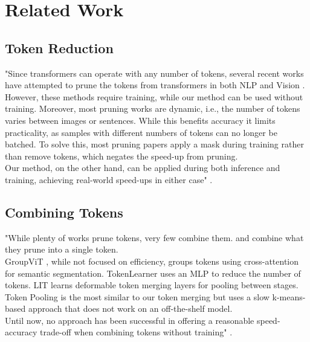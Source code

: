 \section{Related Work}

\subsection*{Token Reduction}
"Since transformers can operate with any number of tokens, several recent works have attempted to prune the tokens from transformers in both NLP \cite{goyal2020power, kim2020length, kim2022learned, lassance2021study} and Vision \cite{meng2022adavit, yin2022vit, kong2021spvit, song2022cp, rao2021dynamicvit, fayyaz2022adaptive, yu2023unified}.\\
However, these methods require training, while our method can be used without training. Moreover, most
pruning works are dynamic, i.e., the number of tokens varies between images or sentences. While this benefits accuracy it limits practicality, as samples with different numbers of tokens can no longer be batched. To solve this, most pruning papers apply a mask during training rather than remove tokens,
which negates the speed-up from pruning.\\
Our method, on the other hand, can be applied during both inference and training, achieving real-world speed-ups in either case" \cite{bolya2023tome}.

\subsection*{Combining Tokens}
"While plenty of works prune tokens, very few combine them. \cite{kong2021spvit} and \cite{liang2022not} combine what they prune into a single token.\\ 
GroupViT \cite{xu2022groupvit}, while not focused on efficiency, groups tokens using cross-attention for semantic segmentation.
TokenLearner \cite{ryoo2021tokenlearner} uses an MLP to reduce the number of tokens.
LIT \cite{pan2022less} learns deformable token merging layers for pooling between stages.\\
Token Pooling \cite{marin2021token} is the most similar to our token merging but uses a slow k-means-based approach that does not work on an off-the-shelf model.\\
Until now, no approach has been successful in offering a reasonable speed-accuracy trade-off when combining tokens without training" \cite{bolya2023tome}.
